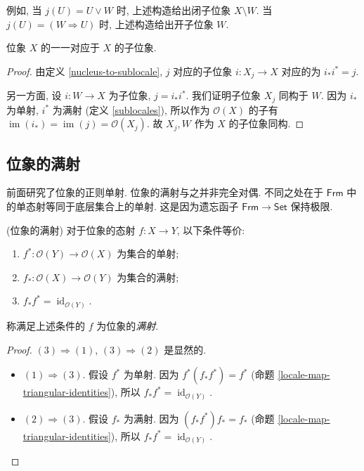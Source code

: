 例如, 当 $j(U) = U\lor W$ 时, 上述构造给出闭子位象 $X\setminus W$. 当 $j(U) = (W\Rightarrow U)$ 时, 上述构造给出开子位象 $W$.

\begin{prop}
	{}
	位象 $X$ 的\nc{}一一对应于 $X$ 的子位象.
\end{prop}
\begin{proof}
	由定义 \ref{nucleus-to-sublocale}, \nc{} $j$ 对应的子位象 $i\colon X_j\to X$ 对应的\nc{}为 $i_*i^* = j$.
	
	另一方面, 设 $i\colon W\to X$ 为子位象, $j=i_*i^*$. 我们证明子位象 $X_j$ 同构于 $W$.
	因为 $i_*$ 为单射, $i^*$ 为满射 (定义 \ref{sublocales}),
	所以作为 $\mathcal O(X)$ 的子\fm{}有 $\operatorname{im}(i_*) = \operatorname{im}(j)=\mathcal O(X_j)$.
	故 $X_j, W$ 作为 $X$ 的子位象同构.
\end{proof}

\subsection{位象的满射}

前面研究了位象的正则单射. 位象的满射与之并非完全对偶. 不同之处在于 $\mathsf {Frm}$ 中的单态射等同于底层集合上的单射. 这是因为遗忘函子 $\mathsf {Frm}\to\mathsf {Set}$ 保持极限.

\begin{propdef}
	{(位象的满射)}
	对于位象的态射 $f\colon X\to Y$, 以下条件等价:
	\begin{enumerate}[(1)]
		\item $f^*\colon \mathcal O(Y)\to\mathcal O(X)$ 为集合的单射;
		\item $f_*\colon \mathcal O(X)\to\mathcal O(Y)$ 为集合的满射;
		\item $f_*f^* = \operatorname{id}_{\mathcal O(Y)}$.
	\end{enumerate}
	称满足上述条件的 $f$ 为位象的\emph{满射}.
\end{propdef}
\begin{proof}
	$(3)\Rightarrow (1)$, $(3)\Rightarrow (2)$ 是显然的.
	\begin{itemize}
		\item $(1)\Rightarrow (3)$. 假设 $f^*$ 为单射. 因为 $f^*(f_*f^*) = f^*$ (命题 \ref{locale-map-triangular-identities}), 所以 $f_*f^*=\operatorname{id}_{\mathcal O(Y)}$.
		\item $(2)\Rightarrow (3)$. 假设 $f_*$ 为满射. 因为 $(f_*f^*)f_* = f_*$ (命题 \ref{locale-map-triangular-identities}), 所以 $f_*f^*=\operatorname{id}_{\mathcal O(Y)}$.
	\end{itemize}
\end{proof}


